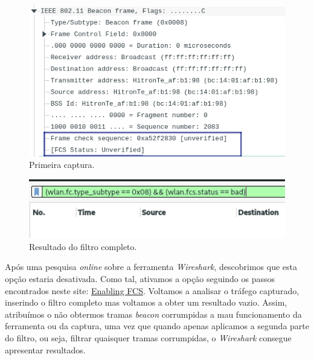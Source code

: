     \vspace{10pt}
    \begin{minipage}{0.5\linewidth}
    \centering
        \begin{figure}[H]
        \centering
        \includegraphics[width=\linewidth]{Prints/Questao5/questao5-CRC-1.png}
        \caption{Primeira captura.} \label{questao5-CRC-1}
        \end{figure}
    \end{minipage}
     \begin{minipage}{0.5\linewidth}
        \centering
        \begin{figure}[H]
        \centering
        \includegraphics[width=\linewidth]{Prints/Questao5/questao5-CRC-Empty.png}
        \caption{Resultado do filtro completo.} \label{questao5-CRC-Empty}
        \end{figure}
    \end{minipage}  
  
    \vspace{15pt}
    Após uma pesquisa \textit{online} sobre a ferramenta \textit{Wireshark}, descobrimos que esta opção estaria desativada. Como tal, ativamos a opção seguindo os passos encontrados neste site: \href{http://wifinigel.blogspot.com/2019/11/wireshark-showing-fcs-fields-as.html}{Enabling FCS}. Voltamos a analisar o tráfego capturado, inserindo o filtro completo mas voltamos a obter um resultado vazio. Assim, atribuímos o não obtermos tramas \textit{beacon} corrumpidas a mau funcionamento da ferramenta ou da captura, uma vez que quando apenas aplicamos a segunda parte do filtro, ou seja, filtrar quaisquer tramas corrumpidas, o \textit{Wireshark} consegue apresentar resultados.
  
